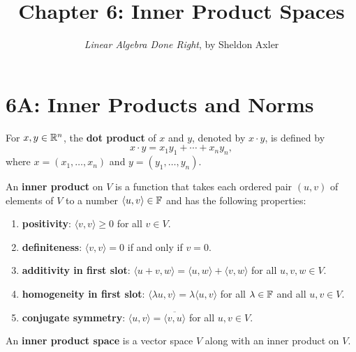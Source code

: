 \documentclass{extarticle}
\title{\vspace{-2em}Chapter 6: Inner Product Spaces}
\author{\emph{Linear Algebra Done Right}, by Sheldon Axler}
\date{}
\begin{document}
\maketitle 
\tableofcontents

\newpage 




\newpage 
\section*{6A: Inner Products and Norms}

\begin{definition}
    For \(x, y \in \mathbb{R}^n\), the \textbf{dot product} of \(x\) and \(y\), denoted by 
    \(x \cdot y\), is defined by 
    \[x \cdot y = x_1 y_1 + \cdots + x_n y_n,\]
    where \(x = (x_1, \ldots, x_n)\) and \(y = (y_1, \ldots, y_n)\).
\end{definition}


\begin{definition}
    An \textbf{inner product} on \(V\) is a function that takes each ordered pair \((u, v)\) of elements of 
    \(V\) to a number \(\langle u,v \rangle \in \mathbb{F}\) and has the following properties:
    \begin{enumerate}[label=(\alph*)]
        \item \textbf{positivity}: \(\langle v,v \rangle \geq 0\) for all  \(v \in V\). 
        \item \textbf{definiteness}: \(\langle v,v \rangle = 0\) if and only if \(v = 0\). 
        \item \textbf{additivity in first slot}: \(\langle u+v,w \rangle = \langle u, w\rangle 
        + \langle v,w \rangle\) for all \(u, v, w \in V\). 
        \item \textbf{homogeneity in first slot}: \(\langle \lambda u,v \rangle 
        = \lambda \langle u,v \rangle\) for all \(\lambda \in \mathbb{F}\) and all \(u, v \in V\). 
        \item \textbf{conjugate symmetry}: \(\langle u,v \rangle = \overline{\langle v,u\rangle}\)
        for all \(u, v \in V\).
    \end{enumerate}
\end{definition}


\begin{definition}
    An \textbf{inner product space} is a vector space \(V\) along with an inner product on \(V\).
\end{definition}
\end{document}
